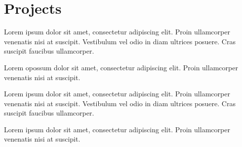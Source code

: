 \documentclass[]{plushcv}
\begin{document}
\begin{minipage}[t]{0.63\textwidth}

\section{Projects}

\begin{tightemize}
\item Lorem ipsum dolor sit amet, consectetur adipiscing elit. Proin ullamcorper venenatis nisi at suscipit. Vestibulum vel odio in diam ultrices posuere. Cras suscipit faucibus ullamcorper.
\item Lorem opossum dolor sit amet, consectetur adipiscing elit. Proin ullamcorper venenatis nisi at suscipit.
\end{tightemize}
\sectionsep

\begin{tightemize}
\item Lorem ipsum dolor sit amet, consectetur adipiscing elit. Proin ullamcorper venenatis nisi at suscipit. Vestibulum vel odio in diam ultrices posuere. Cras suscipit faucibus ullamcorper. 
\item Lorem ipsum dolor sit amet, consectetur adipiscing elit. Proin ullamcorper venenatis nisi at suscipit.
\end{tightemize}
\sectionsep


%
%

\end{minipage} 
\hfill
\end{document}
